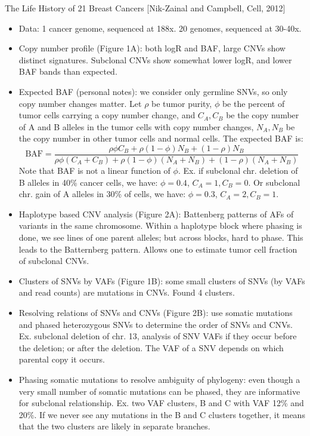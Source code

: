 \documentclass{report}
\begin{document}
The Life History of 21 Breast Cancers [Nik-Zainal and Campbell, Cell, 2012]
\begin{itemize}
	\item Data: 1 cancer genome, sequenced at 188x. 20 genomes, sequenced at 30-40x. 
	
	\item Copy number profile (Figure 1A): both logR and BAF, large CNVs show distinct signatures. Subclonal CNVs show somewhat lower logR, and lower BAF bands than expected.  
	
	\item Expected BAF (personal notes): we consider only germline SNVs, so only copy number changes matter. Let $\rho$ be tumor purity, $\phi$ be the percent of tumor cells carrying a copy number change, and $C_A, C_B$ be the copy number of A and B alleles in the tumor cells with copy number changes, $N_A, N_B$ be the copy number in other tumor cells and normal cells. The expected BAF is: 
	\begin{equation}
	\text{BAF} = \frac{\rho \phi C_B + \rho (1-\phi) N_B + (1-\rho) N_B}{\rho \phi (C_A + C_B) + \rho (1-\phi) (N_A + N_B) + (1-\rho) (N_A + N_B)}
	\end{equation}
	Note that BAF is not a linear function of $\phi$. Ex. if subclonal chr. deletion of B alleles in 40\% cancer cells, we have: $\phi = 0.4$, $C_A = 1, C_B = 0$. Or subclonal chr. gain of A alleles in 30\% of cells, we have: $\phi = 0.3$, $C_A = 2, C_B = 1$. 
	
	\item Haplotype based CNV analysis (Figure 2A): Battenberg patterns of AFs of variants in the same chromosome. Within a haplotype block where phasing is done, we see lines of one parent alleles; but across blocks, hard to phase. This leads to the Batternberg pattern. Allows one to estimate tumor cell fraction of subclonal CNVs. 
	
	\item Clusters of SNVs by VAFs (Figure 1B): some small clusters of SNVs (by VAFs and read counts) are mutations in CNVs. Found 4 clusters. 
	
	\item Resolving relations of SNVs and CNVs (Figure 2B): use somatic mutations and phased heterozygous SNVs to determine the order of SNVs and CNVs. Ex. subclonal deletion of chr. 13, analysis of SNV VAFs if they occur before the deletion; or after the deletion. The VAF of a SNV depends on which parental copy it occurs. 
	
	\item Phasing somatic mutations to resolve ambiguity of phylogeny: even though a very small number of somatic mutations can be phased, they are informative for subclonal relationship. Ex. two VAF clusters, B and C with VAF 12\% and 20\%. If we never see any mutations in the B and C clusters together, it means that the two clusters are likely in separate branches. 
	

\end{itemize}
\end{document}
